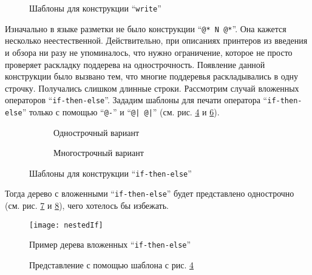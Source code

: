 \begin{figure}[h!]
	\begin{subfigure}[h]{0.45\textwidth}
		
		\caption{}
		\label{fig:writeTmplt1}
	\end{subfigure}
	\begin{subfigure}[h]{0.45\textwidth}
		
		\caption{}
		\label{fig:writeTmplt2}
	\end{subfigure}
	\caption{Шаблоны для конструкции “\lstinline{write}”}
\end{figure}

Изначально в языке разметки не было конструкции “\lstinline{@* N @*}”. Она кажется несколько неестественной. Действительно, при описаниях принтеров из введения и обзора ни разу не упоминалось, что нужно ограничение, которое не просто проверяет раскладку поддерева на однострочность.
Появление данной конструкции было вызвано тем, что многие поддеревья раскладывались в одну строчку. Получались слишком длинные строки. Рассмотрим случай вложенных операторов “\lstinline{if-then-else}”. Зададим шаблоны для печати оператора “\lstinline{if-then-else}” только с помощью “\lstinline{@-}” и “\lstinline{@| @|}” (см. рис. \ref{fig:flatBadIfTmplt} и \ref{fig:multBadIfTmplt}).

\begin{figure}[h!]
	\begin{subfigure}[h]{0.45\textwidth}
		
		\caption{Однострочный вариант}
		\label{fig:flatBadIfTmplt}
	\end{subfigure}
	\begin{subfigure}[h]{0.45\textwidth}
		
		\caption{Многострочный вариант}
		\label{fig:multBadIfTmplt}
	\end{subfigure}
	\caption{Шаблоны для конструкции “\lstinline{if-then-else}”}
\end{figure}

Тогда дерево с вложенными “\lstinline{if-then-else}” будет представлено однострочно (см. рис. \ref{fig:nestedIf} и \ref{fig:nestedIfFlatCode}), чего хотелось бы избежать.

\begin{figure}[h!]
	\centering
	\texttt{[image: nestedIf]}
	\caption{Пример дерева вложенных “\lstinline{if-then-else}”}
	\label{fig:nestedIf}
\end{figure}

\begin{figure}[h!]
	\centering
	
	\caption{Представление с помощью шаблона с рис. \ref{fig:flatBadIfTmplt}}
	\label{fig:nestedIfFlatCode}
\end{figure}

